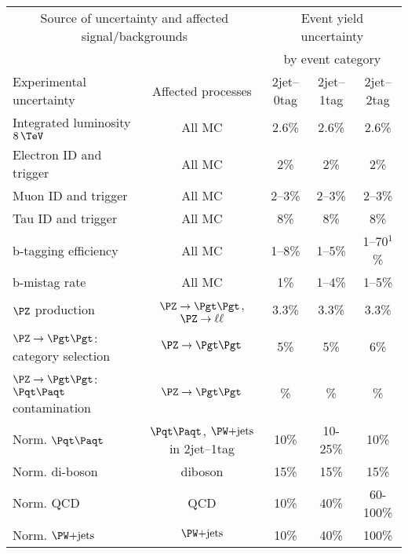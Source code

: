 
\begin{table}[tbhp]
\begin{center}
    \begin{tabular}{|l|c|c|c|c|}
    \hline
    \multicolumn{2}{|c|}{Source of uncertainty and affected signal/backgrounds} & \multicolumn{3}{|c|}{Event yield uncertainty}  \\
    \multicolumn{2}{|c|}{} & \multicolumn{3}{|c|}{by event category} \\
    \hline
     Experimental uncertainty                                  & Affected processes &  2jet--0tag    &  2jet--1tag  &  2jet--2tag      \\
     \hline
     Integrated luminosity $8\,\TeV$                           & All MC & 2.6\% & 2.6\% & 2.6\%       \\
     Electron ID and trigger                                   & All MC &  2\%  & 2\%  & 2\%       \\
     Muon ID and trigger                                       & All MC & 2--3\%       &   2--3\%    & 2--3\%       \\
     Tau ID and trigger                                        & All MC & 8\%  & 8\% & 8\%           \\
     b-tagging efficiency                                      & All MC & 1--8\% &   1--5\%  & 1--70$^{1}$\% \\
     b-mistag rate                                             & All MC & 1\%    &   1--4\%  &   1--5\%       \\
     \hline
     $\PZ$ production                                          & $\ZToTauTau$, $\PZ\to\ell\ell$ & 3.3\%     &   3.3\%    & 3.3\%      \\
     $\PZ\to\Pgt\Pgt$: category selection                      & $\ZToTauTau$ & 5\%  & 5\% & 6\%        \\
     $\PZ\to\Pgt\Pgt$: $\ttbar$ contamination                  & $\ZToTauTau$ & \%  & \% & \%        \\
     Norm. $\ttbar$                                            & $\ttbar$, $\WJets$ in 2jet--1tag & 10\%  &   10-25\%  &  10\%        \\
     Norm. di-boson                                            & diboson & 15\%   &   15\%  &  15\%      \\
     Norm. QCD                                                 & QCD  & 10\%    &   40\% & 60-100\%         \\
     Norm. $\WJets$                                            & $\WJets$ & 10\% &  40\% & 100\%             \\

\end{tabular}
\end{center}
\end{table}
